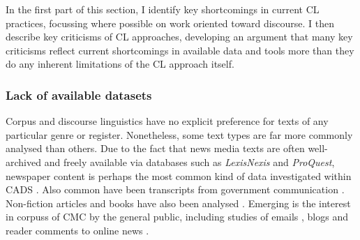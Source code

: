 In the first part of this section, I identify key shortcomings in current \gls{CL} practices, focussing where possible on work oriented toward discourse. I then describe key criticisms of \gls{CL} approaches, developing an argument that many key criticisms reflect current shortcomings in available data and tools more than they do any inherent limitations of the \gls{CL} approach itself.

\subsubsection{Lack of available datasets} \label{sect:listofcorpora}

Corpus and discourse linguistics have no explicit preference for texts of any particular genre or register. Nonetheless, some text types are far more commonly analysed than others. Due to the fact that news media texts are often well\hyp{}archived and freely available via databases such as \emph{LexisNexis} and \emph{ProQuest}, newspaper content is perhaps the most common kind of data investigated within \gls{CADS} \cite[e.g.][]{baker_useful_2008,caldas-coulthard_curvy_2010,partington_modern_2010,baker_sketching_2012,hsiao_corpus_2012,jaworska_f_2012,zinn_changing_2015}. Also common have been transcripts from government communication \cite[e.g.][]{bachmann_civil_2011,mulderrig_hegemony_2012,partington_wodehouse_2008,partington_teasing_2008,partington_double-speak_2011,partington_corpus_2013}. Non\hyp{}fiction articles and books have also been analysed \cite[e.g.][]{de_beaugrande_interpreting_2001,salama_ideological_2011}. Emerging is the interest in \glspl{corpus} of \gls{CMC} by the general public, including studies of emails \cite[e.g.][]{harvey_am_2007,harvey_disclosures_2012}, blogs \cite{lukac_down_2011,chiluwa_social_2012} and reader comments to online news \cite{koteyko_climate_2013}.

